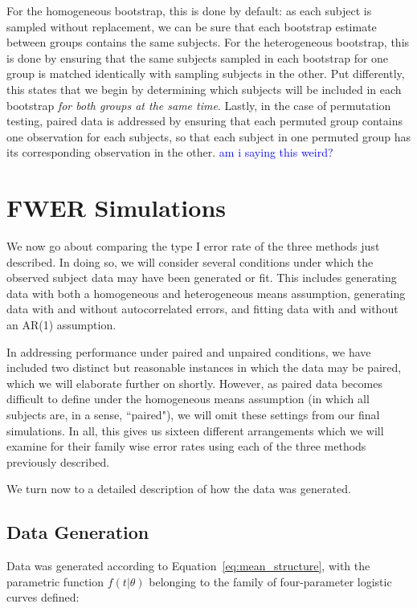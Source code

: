 \documentclass{article}
\providecommand{\cn}[1]{\textcolor{blue}{#1}}
\begin{document}
For the homogeneous bootstrap, this is done by default: as each subject is sampled without replacement, we can be sure that each bootstrap estimate between groups contains the same subjects. For the heterogeneous bootstrap, this is done by ensuring that the same subjects sampled in each bootstrap for one group is matched identically with sampling subjects in the other. Put differently, this states that we begin by determining which subjects will be included in each bootstrap \textit{for both groups at the same time}. Lastly, in the case of permutation testing, paired data is addressed by ensuring that each permuted group contains one observation for each subjects, so that each subject in one permuted group has its corresponding observation in the other. \cn{am i saying this weird?}




\section{FWER Simulations}

We now go about comparing the type I error rate of the three methods just described. In doing so, we will consider several conditions under which the observed subject data may have been generated or fit. This includes generating data with both a homogeneous and heterogeneous means assumption, generating data with and without autocorrelated errors, and fitting data with and without an AR(1) assumption. 

In addressing performance under paired and unpaired conditions, we have included two distinct but reasonable instances in which  the data may be paired, which we will elaborate further on shortly. However, as paired data becomes difficult to define under the homogeneous means assumption (in which all subjects are, in a sense, ``paired"), we will omit these settings from our final simulations. In all, this gives us sixteen different arrangements which we will examine for their family wise error rates using each of the three methods previously described.

We turn now to a detailed description of how the data was generated.

\subsection{Data Generation}

Data was generated according to Equation~\ref{eq:mean_structure}, with the parametric function $f(t|\theta)$ belonging to the family of four-parameter logistic curves defined:
\end{document}
